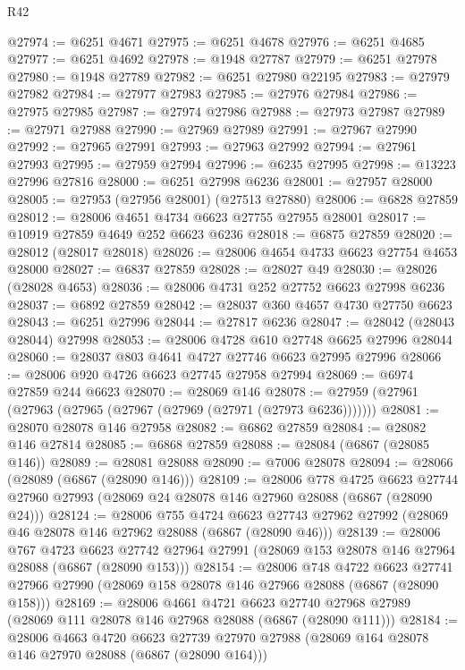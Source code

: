 \begin{lexlean}{R42}
\begin{coremodule}
{@27974 := @6251 @4671
@27975 := @6251 @4678
@27976 := @6251 @4685
@27977 := @6251 @4692
@27978 := @1948 @27787
@27979 := @6251 @27978
@27980 := @1948 @27789
@27982 := @6251 @27980 @22195
@27983 := @27979 @27982
@27984 := @27977 @27983
@27985 := @27976 @27984
@27986 := @27975 @27985
@27987 := @27974 @27986
@27988 := @27973 @27987
@27989 := @27971 @27988
@27990 := @27969 @27989
@27991 := @27967 @27990
@27992 := @27965 @27991
@27993 := @27963 @27992
@27994 := @27961 @27993
@27995 := @27959 @27994
@27996 := @6235 @27995
@27998 := @13223 @27996 @27816
@28000 := @6251 @27998 @6236
@28001 := @27957 @28000
@28005 := @27953 (@27956 @28001) (@27513 @27880)
@28006 := @6828 @27859
@28012 := @28006 @4651 @4734 @6623 @27755 @27955 @28001
@28017 := @10919 @27859 @4649 @252 @6623 @6236
@28018 := @6875 @27859
@28020 := @28012 (@28017 @28018)
@28026 := @28006 @4654 @4733 @6623 @27754 @4653 @28000
@28027 := @6837 @27859
@28028 := @28027 @49
@28030 := @28026 (@28028 @4653)
@28036 := @28006 @4731 @252 @27752 @6623 @27998 @6236
@28037 := @6892 @27859
@28042 := @28037 @360 @4657 @4730 @27750 @6623
@28043 := @6251 @27996
@28044 := @27817 @6236
@28047 := @28042 (@28043 @28044) @27998
@28053 := @28006 @4728 @610 @27748 @6625 @27996 @28044
@28060 := @28037 @803 @4641 @4727 @27746 @6623 @27995 @27996
@28066 := @28006 @920 @4726 @6623 @27745 @27958 @27994
@28069 := @6974 @27859 @244 @6623
@28070 := @28069 @146
@28078 := @27959 (@27961 (@27963 (@27965 (@27967 (@27969 (@27971 (@27973 @6236)))))))
@28081 := @28070 @28078 @146 @27958
@28082 := @6862 @27859
@28084 := @28082 @146 @27814
@28085 := @6868 @27859
@28088 := @28084 (@6867 (@28085 @146))
@28089 := @28081 @28088
@28090 := @7006 @28078
@28094 := @28066 (@28089 (@6867 (@28090 @146)))
@28109 := @28006
    @778
    @4725
    @6623
    @27744
    @27960
    @27993
    (@28069 @24 @28078 @146 @27960 @28088 (@6867 (@28090 @24)))
@28124 := @28006
    @755
    @4724
    @6623
    @27743
    @27962
    @27992
    (@28069 @46 @28078 @146 @27962 @28088 (@6867 (@28090 @46)))
@28139 := @28006
    @767
    @4723
    @6623
    @27742
    @27964
    @27991
    (@28069 @153 @28078 @146 @27964 @28088 (@6867 (@28090 @153)))
@28154 := @28006
    @748
    @4722
    @6623
    @27741
    @27966
    @27990
    (@28069 @158 @28078 @146 @27966 @28088 (@6867 (@28090 @158)))
@28169 := @28006
    @4661
    @4721
    @6623
    @27740
    @27968
    @27989
    (@28069 @111 @28078 @146 @27968 @28088 (@6867 (@28090 @111)))
@28184 := @28006
    @4663
    @4720
    @6623
    @27739
    @27970
    @27988
    (@28069 @164 @28078 @146 @27970 @28088 (@6867 (@28090 @164)))
}
\end{coremodule}
\end{lexlean}
